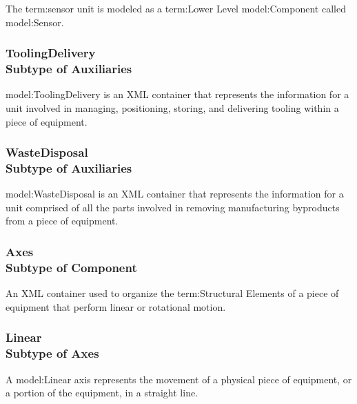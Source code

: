\FloatBarrier

The {term:sensor unit} is modeled as a {term:Lower Level} {model:Component} called {model:Sensor}.

\FloatBarrier
\subsubsection[ToolingDelivery]{ToolingDelivery \\ {\small Subtype of Auxiliaries}}
  \label{type:ToolingDelivery}

\FloatBarrier

{model:ToolingDelivery} is an XML container that represents the information for a unit involved in managing, positioning, storing, and delivering tooling within a piece of equipment.


\FloatBarrier
\subsubsection[WasteDisposal]{WasteDisposal \\ {\small Subtype of Auxiliaries}}
  \label{type:WasteDisposal}

\FloatBarrier

{model:WasteDisposal} is an XML container that represents the information for a unit comprised of all the parts involved in removing manufacturing byproducts from a piece of equipment.


\FloatBarrier
\subsubsection[Axes]{Axes \\ {\small Subtype of Component}}
  \label{type:Axes}

\FloatBarrier

An XML container used to organize the {term:Structural Elements} of a piece of equipment that perform linear or rotational motion.

\FloatBarrier
\subsubsection[Linear]{Linear \\ {\small Subtype of Axes}}
  \label{type:Linear}

\FloatBarrier

A {model:Linear} axis represents the movement of a physical piece of equipment, or a portion of the equipment, in a straight line. 

